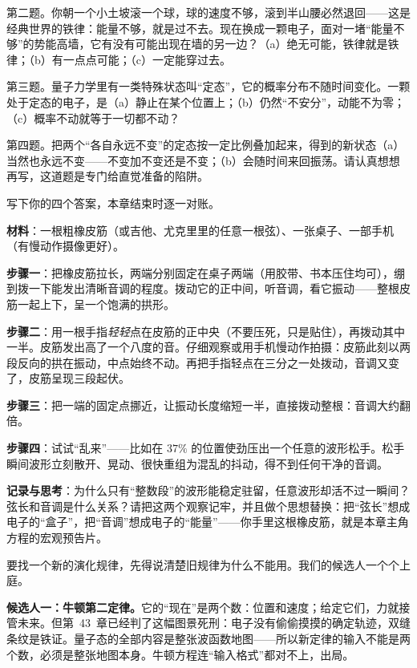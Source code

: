 第二题。你朝一个小土坡滚一个球，球的速度不够，滚到半山腰必然退回——这是经典世界的铁律：能量不够，就是过不去。现在换成一颗电子，面对一堵“能量不够”的势能高墙，它有没有可能出现在墙的另一边？（a）绝无可能，铁律就是铁律；（b）有一点点可能；（c）一定能穿过去。

第三题。量子力学里有一类特殊状态叫“定态”，它的概率分布不随时间变化。一颗处于定态的电子，是（a）静止在某个位置上；（b）仍然“不安分”，动能不为零；（c）概率不动就等于一切都不动？

第四题。把两个“各自永远不变”的定态按一定比例叠加起来，得到的新状态（a）当然也永远不变——不变加不变还是不变；（b）会随时间来回振荡。请认真想想再写，这道题是专门给直觉准备的陷阱。

写下你的四个答案，本章结束时逐一对账。


\begin{experiment}[一根橡皮筋的音阶]
\textbf{材料}：一根粗橡皮筋（或吉他、尤克里里的任意一根弦）、一张桌子、一部手机（有慢动作摄像更好）。

\textbf{步骤一}：把橡皮筋拉长，两端分别固定在桌子两端（用胶带、书本压住均可），绷到拨一下能发出清晰音调的程度。拨动它的正中间，听音调，看它振动——整根皮筋一起上下，呈一个饱满的拱形。

\textbf{步骤二}：用一根手指\emph{轻轻}点在皮筋的正中央（不要压死，只是贴住），再拨动其中一半。皮筋发出高了一个八度的音。仔细观察或用手机慢动作拍摄：皮筋此刻以两段反向的拱在振动，中点始终不动。再把手指轻点在三分之一处拨动，音调又变了，皮筋呈现三段起伏。

\textbf{步骤三}：把一端的固定点挪近，让振动长度缩短一半，直接拨动整根：音调大约翻倍。

\textbf{步骤四}：试试“乱来”——比如在 \(37\%\) 的位置使劲压出一个任意的波形松手。松手瞬间波形立刻散开、晃动、很快重组为混乱的抖动，得不到任何干净的音调。

\textbf{记录与思考}：为什么只有“整数段”的波形能稳定驻留，任意波形却活不过一瞬间？弦长和音调是什么关系？请把这两个观察记牢，并且做个思想替换：把“弦长”想成电子的“盒子”，把“音调”想成电子的“能量”——你手里这根橡皮筋，就是本章主角方程的宏观预告片。
\end{experiment}


要找一个新的演化规律，先得说清楚旧规律为什么不能用。我们的候选人一个个上庭。

\textbf{候选人一：牛顿第二定律。}它的“现在”是两个数：位置和速度；给定它们，力就接管未来。但第~43~章已经判了这幅图景死刑：电子没有偷偷摸摸的确定轨迹，双缝条纹是铁证。量子态的全部内容是整张波函数地图——所以新定律的输入不能是两个数，必须是整张地图本身。牛顿方程连“输入格式”都对不上，出局。

